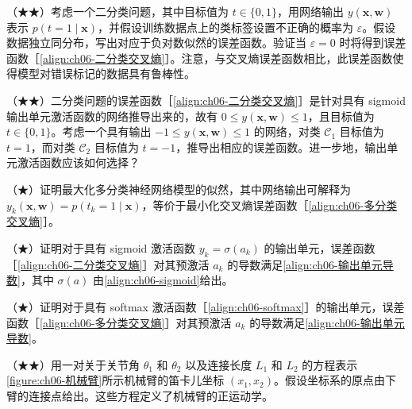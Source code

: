 \documentclass[../../main.tex]{subfiles}
\begin{document}
\begin{exercise}\label{exercise:ch06-11}
（★★）考虑一个二分类问题，其中目标值为 $t\in\{0,1\}$，用网络输出 $y(\boldsymbol{x},\boldsymbol{w})$ 表示 $p(t=1\mid\boldsymbol{x})$，并假设训练数据点上的类标签设置不正确的概率为 $\varepsilon$。假设数据独立同分布，写出对应于负对数似然的误差函数。验证当 $\varepsilon=0$ 时将得到误差函数［\eqref{align:ch06-二分类交叉熵}］。注意，与交叉熵误差函数相比，此误差函数使得模型对错误标记的数据具有鲁棒性。
\end{exercise}

\begin{exercise}\label{exercise:ch06-12}
（★★）二分类问题的误差函数［\eqref{align:ch06-二分类交叉熵}］是针对具有 sigmoid 输出单元激活函数的网络推导出来的，故有 $0\leqslant y(\boldsymbol{x},\boldsymbol{w})\leqslant1$，且目标值为 $t\in\{0,1\}$。考虑一个具有输出 $-1\leqslant y(\boldsymbol{x},\boldsymbol{w})\leqslant1$ 的网络，对类 $\mathcal{C}_1$ 目标值为 $t=1$，而对类 $\mathcal{C}_2$ 目标值为 $t=-1$，推导出相应的误差函数。进一步地，输出单元激活函数应该如何选择？
\end{exercise}

\begin{exercise}\label{exercise:ch06-13}
（★）证明最大化多分类神经网络模型的似然，其中网络输出可解释为 $y_k(\boldsymbol{x},\boldsymbol{w})=p(t_k=1\mid\boldsymbol{x})$，等价于最小化交叉熵误差函数［\eqref{align:ch06-多分类交叉熵}］。
\end{exercise}

\begin{exercise}\label{exercise:ch06-14}
（★）证明对于具有 sigmoid 激活函数 $y_k=\sigma(a_k)$ 的输出单元，误差函数［\eqref{align:ch06-二分类交叉熵}］对其预激活 $a_k$ 的导数满足\eqref{align:ch06-输出单元导数}，其中 $\sigma(a)$ 由\eqref{align:ch06-sigmoid}给出。
\end{exercise}

\begin{exercise}\label{exercise:ch06-15}
（★）证明对于具有 softmax 激活函数［\eqref{align:ch06-softmax}］的输出单元，误差函数［\eqref{align:ch06-多分类交叉熵}］对其预激活 $a_k$ 的导数满足\eqref{align:ch06-输出单元导数}。
\end{exercise}

\begin{exercise}\label{exercise:ch06-16}
（★★）用一对关于关节角 $\theta_1$ 和 $\theta_2$ 以及连接长度 $L_1$ 和 $L_2$ 的方程表示\cref{figure:ch06-机械臂}所示机械臂的笛卡儿坐标 $(x_1,x_2)$。假设坐标系的原点由下臂的连接点给出。这些方程定义了机械臂的正运动学。
\end{exercise}
\end{document}
